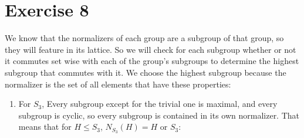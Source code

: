 \documentclass{article}
\newcommand{\seq}{\leqslant}
\begin{document}
    \section*{Exercise 8}
    We know that the normalizers of each group are a subgroup
    of that group,
    so they will feature in its lattice.
    So we will check for each subgroup whether or not it commutes
    set wise with each of the group's subgroups
    to determine the highest subgroup that commutes with it.
    We choose the highest subgroup because the normalizer
    is the set of all elements that have these properties:
    \begin{enumerate}[label=\textbf{\alph*.}]
        \item
            For $S_3$,
            Every subgroup except for the trivial one is maximal,
            and every subgroup is cyclic,
            so every subgroup is contained in its own normalizer.
            That means that for $H \seq S_3$,
            $N_{S_3}(H) = H$ or $S_3$:

            \begin{figure}[H]
                \centering
\end{figure}
\end{enumerate}
\end{document}

